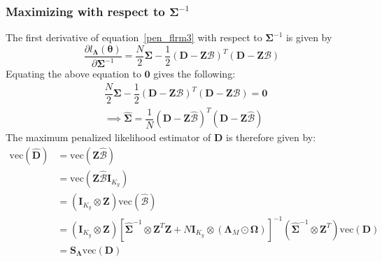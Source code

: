\subsubsection*{Maximizing with respect to $\bm{\Sigma}^{-1}$}
The first derivative of equation~\eqref{pen_flrm3} with respect to $\bm{\Sigma}^{-1}$ is given by
\begin{equation*}
\dfrac{\partial l_{\bm{\Lambda}}(\bm{\theta})}{\partial \bm{\Sigma}^{-1}} = \dfrac{N}{2}\bm{\Sigma}-\dfrac{1}{2}\left(\bm{D} - \bm{Z} \bm{\mathcal{B}}\right)^T \left(\bm{D} - \bm{Z} \bm{\mathcal{B}}\right)
\end{equation*}
Equating the above equation to $\bm{0}$ gives the following:
\begin{align}
& \dfrac{N}{2}\bm{\Sigma}-\dfrac{1}{2}\left(\bm{D} - \bm{Z} \bm{\mathcal{B}}\right)^T \left(\bm{D} - \bm{Z} \bm{\mathcal{B}}\right) = \bm{0} \nonumber \\
& \implies \hat{\bm{\Sigma}} = \dfrac{1}{N} \left(\bm{D} - \bm{Z} \hat{\bm{\mathcal{B}}}\right)^T \left(\bm{D} - \bm{Z} \hat{\bm{\mathcal{B}}}\right)\label{sigma_hat}
\end{align}
The maximum penalized likelihood estimator of $\bm{D}$ is therefore given by:
\begin{align}
\text{vec} (\hat{\bm{D}}) &= \text{vec} \left(\bm{Z} \hat{\bm{\mathcal{B}}}\right) \nonumber \\
&= \text{vec} \left(\bm{Z} \hat{\bm{\mathcal{B}}} \bm{I}_{K_y}\right) \nonumber \\
&= \left(\bm{I}_{K_y} \otimes \bm{Z} \right)\text{vec} (\hat{\bm{\mathcal{B}}}) \nonumber \\
&= \left(\bm{I}_{K_y} \otimes \bm{Z} \right)\left[\hat{\bm{\Sigma}}^{-1} \otimes \bm{Z}^T\bm{Z} + N \bm{I}_{K_y} \otimes \left(\bm{\Lambda}_M \odot \bm{\Omega} \right)\right]^{-1}\left(\hat{\bm{\Sigma}}^{-1} \otimes \bm{Z}^T \right) \text{vec}\left(\bm{D}\right) \nonumber \\
&= \bm{S}_{\bm{\Lambda}} \text{vec}\left(\bm{D}\right) \label{hat_flrm}
\end{align}

